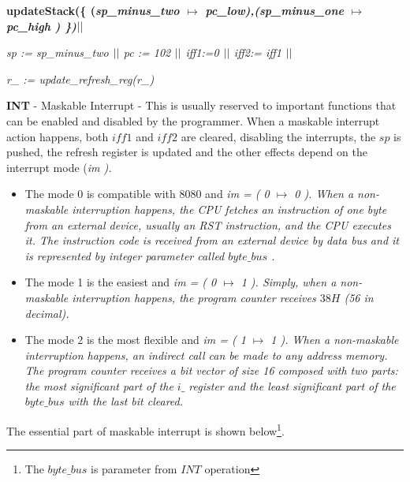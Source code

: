 \documentclass[11pt]{article} %
\begin{document}
\begin{sloppypar}
\bf updateStack\rm (\rm \{ \rm (\it sp\_minus\_two  $\mapsto$  \it pc\_low\rm )\rm ,\rm (\it sp\_minus\_one  $\mapsto$ \it pc\_high \rm ) \rm \}\rm )$\mbox{$\mid\mid$}$

\it sp \rm := \it sp\_minus\_two  $\mbox{$\mid\mid$}$ \it pc \rm := \rm 1\rm 0\rm 2 $\mbox{$\mid\mid$}$ \it iff1\rm :=\rm 0  $\mbox{$\mid\mid$}$  \it iff2\rm := \it iff1 $\mbox{$\mid\mid$}$

\it r\_ \rm := \it update\_refresh\_reg\rm (\it r\_\rm )\\
\end{sloppypar}

  \textbf{INT} - Maskable Interrupt -  This is usually reserved to important functions that can be enabled and
  disabled by the programmer. When a maskable interrupt action happens, both $\mathit{iff1}$ and $\mathit{iff2}$ are
  cleared, disabling the interrupts, the $sp$ is pushed, the refresh register is updated  and the other effects
  depend on the interrupt mode (\it im \rm).
 

 \begin{itemize}
   
  \item The mode 0 is compatible with 8080 and  \it im \rm = \rm ( \rm 0 $\mapsto$  \rm 0 \rm ). When a 
  non-maskable interruption happens, the CPU fetches an instruction of one byte
  from an external device, usually an RST instruction, and the CPU executes it.
  The instruction code is received from an external device by data bus and it is represented by integer parameter called $\mathit{byte\_bus}$ .

 
  \item The mode 1 is the easiest and \it im \rm = \rm ( \rm 0  $\mapsto$  \rm 1
  \rm ). Simply, when a non-maskable interruption happens, the program counter
  receives $38H$ (56 in decimal).
  
  \item The mode 2 is the most flexible and  \it im \rm = \rm ( \rm 1  $\mapsto$
  \rm 1 \rm ). When a non-maskable interruption happens, an indirect call can be
  made to any address memory. The program counter receives a bit vector of size
  16 composed with two parts: the most significant part of the $\mathit{i\_}$
  register and the least significant part of the $\mathit{byte\_bus}$ with the
  last bit cleared.
 \end{itemize}

The essential part of maskable interrupt is shown below\footnote{ The
 $\mathit{byte\_bus}$ is parameter from  $\mathit{INT}$ operation }. 
 
\end{document}
